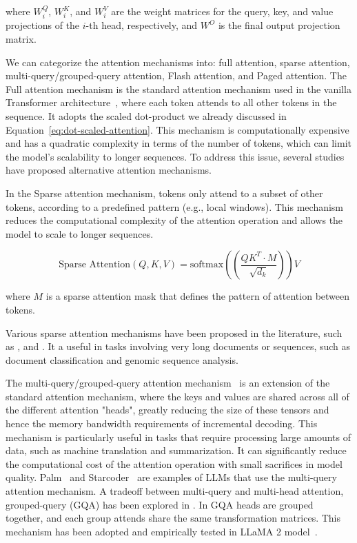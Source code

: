 \noindent where \(W_i^Q\), \(W_i^K\), and \(W_i^V\) are the weight matrices for the query, key, and value projections of the \(i\)-th head, respectively, and \(W^O\) is the final output projection matrix.

We can categorize the attention mechanisms into: full attention, sparse attention, multi-query/grouped-query attention, Flash attention, and Paged attention.
The Full attention mechanism is the standard attention mechanism used in the vanilla Transformer architecture~\cite{vaswani2023attention}, where each token attends to all other tokens in the sequence.
It adopts the scaled dot-product we already discussed in Equation~\ref{eq:dot-scaled-attention}.
This mechanism is computationally expensive and has a quadratic complexity in terms of the number of tokens, which can limit the model's scalability to longer sequences.
To address this issue, several studies have proposed alternative attention mechanisms.

In the Sparse attention mechanism, tokens only attend to a subset of other tokens, according to a predefined pattern (e.g., local windows).
This mechanism reduces the computational complexity of the attention operation and allows the model to scale to longer sequences.

\begin{equation}
	\text{Sparse Attention}(Q, K, V) = \text{softmax}((\frac{QK^T \cdotp M}{\sqrt{d_k}}))V
	\label{eq:sparse-attention}
\end{equation}

\noindent where \(M\) is a sparse attention mask that defines the pattern of attention between tokens.

Various sparse attention mechanisms have been proposed in the literature, such as \textcite{peng2021random}, \textcite{zaheer2020big} and \textcite{child2019generating}.
It a useful in tasks involving very long documents or sequences, such as document classification and genomic sequence analysis.

The multi-query/grouped-query attention mechanism~\cite{shazeer2019fast} is an extension of the standard attention mechanism, where the keys and values are shared across all of the different attention "heads", greatly reducing the size of these tensors and hence the memory bandwidth requirements of incremental decoding.
This mechanism is particularly useful in tasks that require processing large amounts of data, such as machine translation and summarization.
It can significantly reduce the computational cost of the attention operation with small sacrifices in model quality.
Palm~\cite{chowdhery2022palm} and Starcoder~\cite{li2023starcoder} are examples of LLMs that use the multi-query attention mechanism.
A tradeoff between multi-query and multi-head attention, grouped-query (GQA) has been explored in \textcite{ainslie2023gqa}.
In GQA heads are grouped together, and each group attends share the same transformation matrices.
This mechanism has been adopted and empirically tested in LLaMA 2 model~\cite{touvron2023llama2}.

